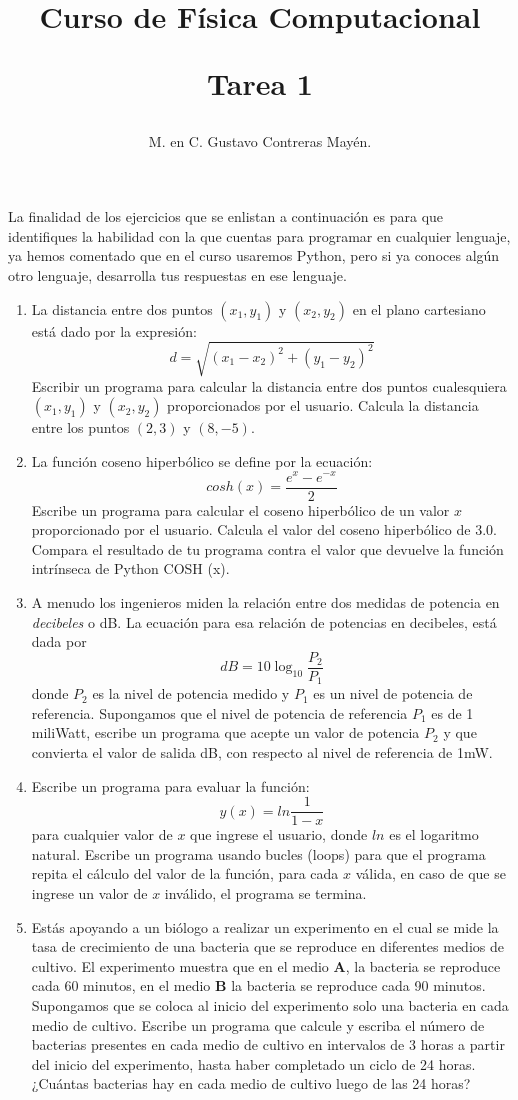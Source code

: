 \documentclass[12pt]{article}
\author{M. en C. Gustavo Contreras May\'{e}n.}
\title{Curso de F\'{i}sica Computacional \\ \begin{Large} Tarea 1\end{Large} }
\date{ }
\begin{document}
\maketitle
\fontsize{14}{14}\selectfont
La finalidad de los ejercicios que se enlistan a continuaci\'{o}n es para que identifiques la habilidad con la que cuentas para programar en cualquier lenguaje, ya hemos comentado que en el curso usaremos Python, pero si ya conoces alg\'{u}n otro lenguaje, desarrolla tus respuestas en ese lenguaje.
\\
\begin{enumerate}
\item La distancia entre dos puntos $(x_{1},y_{1})$ y $(x_{2},y_{2})$ en el plano cartesiano est\'{a} dado por la expresi\'{o}n:
\[ d = \sqrt{(x_{1} - x_{2})^{2} + (y_{1} - y_{2})^{2}} \]
Escribir un programa para calcular la distancia entre dos puntos cualesquiera $(x_{1}, y_{1})$ y $(x_{2}, y_{2})$ proporcionados por el usuario. Calcula la distancia entre los puntos $(2,3)$ y $(8,-5)$.
\item La funci\'{o}n coseno hiperb\'{o}lico se define por la ecuaci\'{o}n:
\[ cosh(x) = \dfrac{e^{x} - e^{-x}}{2} \]
Escribe un programa para calcular el coseno hiperb\'{o}lico de un valor $x$ proporcionado por el usuario. Calcula el valor del coseno hiperb\'{o}lico de $3.0$. Compara el resultado de tu programa contra el valor que devuelve la funci\'{o}n intr\'{i}nseca de Python COSH (x).
\item A menudo los ingenieros miden la relaci\'{o}n entre dos medidas de potencia en \textit{decibeles} o dB. La ecuaci\'{o}n para esa relaci\'{o}n de potencias en decibeles, est\'{a} dada por
\[ dB = 10 \log_{10} \dfrac{P_{2}}{P_{1}} \]
donde $P_{2}$ es la nivel de potencia medido y $P_{1}$ es un nivel de potencia de referencia. Supongamos que el nivel de potencia de referencia $P_{1}$ es de 1 miliWatt, escribe un programa que acepte un valor de potencia $P_{2}$ y que convierta el valor de salida dB, con respecto al nivel de referencia de 1mW.
\item Escribe un programa para evaluar la funci\'{o}n:
\[ y(x) = ln \dfrac{1}{1-x} \]
para cualquier valor de $x$ que ingrese el usuario, donde $ln$ es el logaritmo natural. Escribe un programa usando bucles (loops) para que el programa repita el c\'{a}lculo del valor de la funci\'{o}n, para cada $x$ v\'{a}lida, en caso de que se ingrese un valor de $x$ inv\'{a}lido, el programa se termina.
\item Est\'{a}s apoyando a un bi\'{o}logo a realizar un experimento en el cual se mide la tasa de crecimiento de una bacteria que se reproduce en diferentes medios de cultivo. El experimento muestra que en el medio \textbf{A}, la bacteria se reproduce cada 60  minutos, en el medio \textbf{B} la bacteria se reproduce cada 90 minutos. Supongamos que se coloca al inicio del experimento solo una bacteria en cada medio de cultivo. Escribe un programa que calcule y escriba el n\'{u}mero de bacterias presentes en cada medio de cultivo en intervalos de 3 horas a partir del inicio del experimento, hasta haber completado un ciclo de 24 horas. ¿Cu\'{a}ntas bacterias hay en cada medio de cultivo luego de las 24 horas?

\end{enumerate}
\end{document}

